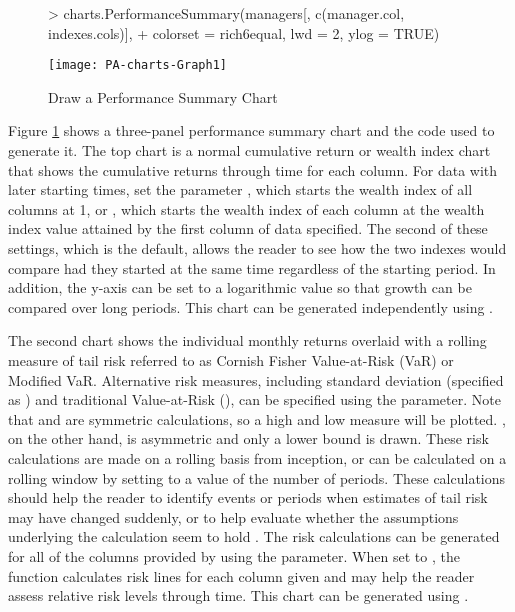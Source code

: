 \documentclass[12pt,letterpaper,english]{article}
\begin{document}
%
\begin{figure}

\caption{Draw a Performance Summary Chart}

\label{fig:Draw-a-Performance}

\begin{center}

\begin{Schunk}
\begin{Sinput}
> charts.PerformanceSummary(managers[, c(manager.col, indexes.cols)], 
+     colorset = rich6equal, lwd = 2, ylog = TRUE)
\end{Sinput}
\end{Schunk}
\texttt{[image: PA-charts-Graph1]}

\end{center}
\end{figure}


Figure \ref{fig:Draw-a-Performance} shows a three-panel performance
summary chart and the code used to generate it. The top chart is a
normal cumulative return or wealth index chart that shows the cumulative
returns through time for each column. For data with later starting
times, set the parameter ,
which starts the wealth index of all columns at 1, or , which
starts the wealth index of each column at the wealth index value attained
by the first column of data specified. The second of these settings,
which is the default, allows the reader to see how the two indexes
would compare had they started at the same time regardless of the
starting period. In addition, the y-axis can be set to a logarithmic
value so that growth can be compared over long periods. This chart
can be generated independently using .

The second chart shows the individual monthly returns overlaid with
a rolling measure of tail risk referred to as Cornish Fisher Value-at-Risk
(VaR) or Modified VaR. Alternative risk measures, including standard
deviation (specified as ) and traditional
Value-at-Risk (), can be specified
using the  parameter. Note that  and
 are symmetric calculations, so a high and low measure
will be plotted. , on the other hand, is asymmetric
and only a lower bound is drawn. These risk calculations are made
on a rolling basis from inception, or can be calculated on a rolling
window by setting  to a value of the number of periods.
These calculations should help the reader to identify events or periods
when estimates of tail risk may have changed suddenly, or to help
evaluate whether the assumptions underlying the calculation seem to
hold . The risk calculations can be generated for all of the columns
provided by using the  parameter. When set to ,
the function calculates risk lines for each column given and may help
the reader assess relative risk levels through time. This chart can
be generated using .
\end{document}
